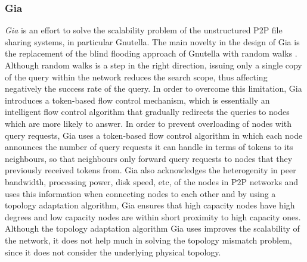\subsubsection{Gia}
\emph{Gia} \cite{chawathe_gia_2003} is an effort to solve the scalability
problem of the unstructured P2P file sharing systems, in particular Gnutella.
The main novelty in the design of Gia is the replacement of the blind flooding
approach of Gnutella with random walks \cite{lv_randomwalks_2002}. Although
random walks is a step in the right direction, issuing only a single copy of the
query within the network reduces the search scope, thus affecting negatively the
success rate of the query.  In order to overcome this limitation, Gia introduces
a token-based flow control mechanism, which is essentially an intelligent flow
control algorithm that gradually redirects the queries to nodes which are more
likely to answer. In order to prevent overloading of nodes with query requests,
Gia uses a token-based flow control algorithm in which each node announces the
number of query requests it can handle in terms of tokens to its neighbours, so
that neighbours only forward query requests to nodes that they previously
received tokens from. Gia also acknowledges the heterogenity in peer bandwidth,
processing power, disk speed, etc, of the nodes in P2P networks and uses this
information when connecting nodes to each other and by using a topology
adaptation algorithm, Gia ensures that high capacity nodes have high degrees and
low capacity nodes are within short proximity to high capacity ones.
Although the topology adaptation algorithm Gia uses improves the scalability of
the network, it does not help much in solving the topology mismatch problem,
since it does not consider the underlying physical topology.

%
%

